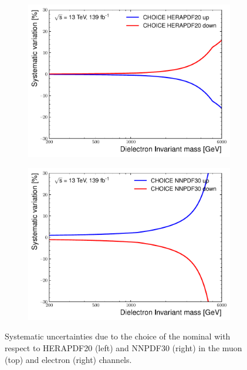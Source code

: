 \begin{figure}[h!]
\begin{subfigure}[b]{0.42\textwidth}
        \label{fig:uncert:mmchoiceNNPDF}
    \end{subfigure}
    \begin{subfigure}[b]{0.42\textwidth}
        \centering
        \includegraphics[width=\textwidth]{figures/analysis/datamc/Uncertainties/theory/ee/backgroundTemplate_KF_CHOICE_HERAPDF20.pdf}
        \label{fig:uncert:eechoiceHERA}
    \end{subfigure}
    \begin{subfigure}[b]{0.42\textwidth}
        \centering
        \includegraphics[width=\textwidth]{figures/analysis/datamc/Uncertainties/theory/ee/backgroundTemplate_KF_CHOICE_NNPDF30.pdf}
        \label{fig:uncert:eechoiceNNPDF}
    \end{subfigure}
    \caption{Systematic uncertainties due to the choice of the nominal with respect to HERAPDF20 (left) and NNPDF30 (right) in the muon (top) and electron (right) channels.}
    \label{fig:uncert:pdfchoice}
\end{figure}


